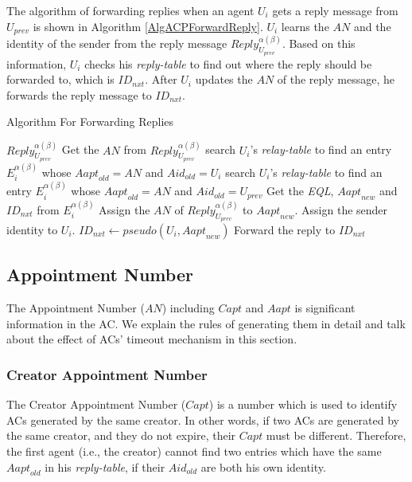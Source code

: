 \documentclass[conference]{IEEEtran}
\begin{document}
The algorithm of forwarding replies when an agent $U_i$ gets a reply message from $U_{prev}$ is shown in Algorithm \ref{AlgACPForwardReply}. $U_i$ learns the $AN$ and the identity of the sender from the reply message ${Reply}_{U_{prev}}^{\alpha\left(\beta\right)}$. Based on this information, $U_i$ checks his \textit{reply-table} to find out where the reply should be forwarded to, which is ${ID}_{nxt}$. After $U_i$ updates the $AN$ of the reply message, he forwards the reply message to ${ID}_{nxt}$.

\begin{algorithm} [hbtp]
\caption{Algorithm For Forwarding Replies}\label{AlgACPForwardReply}
\begin{algorithmic}[1]
 {${Reply}_{U_{prev}}^{\alpha\left(\beta\right)}$}
\State Get the $AN$ from ${Reply}_{U_{prev}}^{\alpha\left(\beta\right)}$
	\State search $U_i$’s \textit{relay-table} to find an entry $E_i^{\alpha\left(\beta\right)}$
	\State whose ${Aapt}_{old}=AN$ and ${Aid}_{old}=U_i$
\Else
	\State search $U_i$’s \textit{relay-table} to find an entry $E_i^{\alpha\left(\beta\right)}$
	\State whose ${Aapt}_{old}=AN$ and ${Aid}_{old}=U_{prev}$	
\EndIf
\State Get the \textit{EQL}, ${Aapt}_{new}$ and ${ID}_{nxt}$ from $E_i^{\alpha\left(\beta\right)}$
\State Assign the $AN$ of ${Reply}_{U_{prev}}^{\alpha\left(\beta\right)}$ to ${Aapt}_{new}$.
\State Assign the sender identity to $U_i$.
	\State ${ID}_{nxt}\gets pseudo\left(U_i,{Aapt}_{new}\right)$
\EndIf
\State Forward the reply to ${ID}_{nxt}$
\EndProcedure

\end{algorithmic}
\end{algorithm}

\subsection{ Appointment Number}

The Appointment Number ($AN$) including $Capt$ and $Aapt$ is significant information in the AC. We explain the rules of generating them in detail and talk about the effect of ACs' timeout mechanism in this section.


\subsubsection{  Creator Appointment Number}

The Creator Appointment Number ($Capt$) is a number which is used to identify ACs generated by the same creator. In other words, if two ACs are generated by the same creator, and they do not expire, their $Capt$ must be different. Therefore, the first agent (i.e., the creator) cannot find two entries which have the same ${Aapt}_{old}$ in his \textit{reply-table}, if their ${Aid}_{old}$ are both his own identity.
\end{document}
